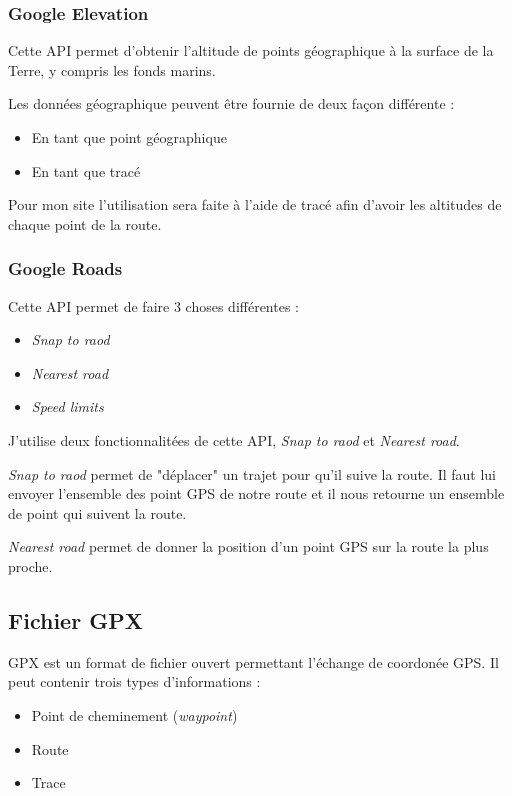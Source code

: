 \documentclass[a4paper]{article}
\begin{document}
\subsubsection{Google Elevation}
Cette API permet d'obtenir l'altitude de points géographique à la surface de la Terre, y compris les fonds marins.

Les données géographique peuvent être fournie de deux façon différente : 
\begin{itemize}
	\item En tant que point géographique
	\item En tant que tracé
\end{itemize}

Pour mon site l'utilisation sera faite à l'aide de tracé afin d'avoir les altitudes de chaque point de la route.


\subsubsection{Google Roads}
Cette API permet de faire 3 choses différentes :
\begin{itemize}
    \item \emph{Snap to raod}
    \item \emph{Nearest road}
    \item \emph{Speed limits}
\end{itemize}

J'utilise deux fonctionnalitées de cette API, \emph{Snap to raod} et \emph{Nearest road}.

\emph{Snap to raod} permet de "déplacer" un trajet pour qu'il suive la route. Il faut lui envoyer l'ensemble des point GPS de notre route et il nous retourne un ensemble de point qui suivent la route.

\emph{Nearest road} permet de donner la position d'un point GPS sur la route la plus proche.

\subsection{Fichier GPX}
GPX est un format de fichier ouvert permettant l'échange de coordonée GPS. Il peut contenir trois types d'informations : 

\begin{itemize}
	\item Point de cheminement (\emph{waypoint})
	\item Route
	\item Trace
\end{itemize}
\end{document}
